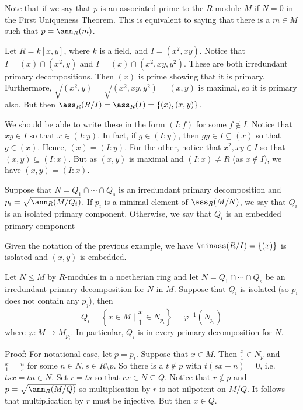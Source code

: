 \begin{rem}
Note that if we say that $p$ is an associated prime to the $R$-module $M$ if $N=0$ in the First Uniqueness Theorem. This is equivalent to saying that there is a $m \in M$ such that $p=\ann_R(m)$. 
\end{rem}

\begin{ex}
Let $R=k[x,y]$, where $k$ is a field, and $I=(x^2,xy)$. Notice that $I=(x) \cap (x^2,y)$ and $I=(x) \cap (x^2,xy,y^2)$. These are both irredundant primary decompositions. Then $(x)$ is prime showing that it is primary. Furthermore, $\sqrt{(x^2,y)}=\sqrt{(x^2,xy,y^2)}=(x,y)$ is maximal, so it is primary also. But then $\ass_R(R/I)=\ass_R(I)=\{(x),(x,y)\}$. 

We should be able to write these in the form $(I:f)$ for some $f \notin I$. Notice that $xy \in I$ so that $x \in (I:y)$. In fact, if $g \in (I:y)$, then $gy \in I \subseteq (x)$ so that $g \in (x)$. Hence, $(x)=(I:y)$. For the other, notice that $x^2,xy \in I$ so that $(x,y) \subseteq (I:x)$. But as $(x,y)$ is maximal and $(I:x) \neq R$ (as $x \notin I$), we have $(x,y)=(I:x)$. 
\end{ex}

\begin{dfn}
Suppose that $N=Q_1 \cap \cdots \cap Q_s$ is an irredundant primary decomposition and $p_i=\sqrt{\ann_R(M/Q_i)}$. If $p_i$ is a minimal element of $\ass_R(M/N)$, we say that $Q_i$ is an isolated primary component. Otherwise, we say that $Q_i$ is an embedded primary component
\end{dfn}

\begin{ex}
Given the notation of the previous example, we have $\minass(R/I)=\{(x)\}$ is isolated and $(x,y)$ is embedded. 
\end{ex}

\begin{thmm}
Let $N \leq M$ by $R$-modules in a noetherian ring and let $N=Q_1 \cap \cdots \cap Q_s$ be an irredundant primary decomposition for $N$ in $M$. Suppose that $Q_i$ is isolated (so $p_i$ does not contain any $p_j$), then
\[
Q_i=\left\{x \in M \;|\; \frac{x}{1} \in N_{p_i} \right\}= \varphi^{-1}(N_{p_i})
\]
where $\varphi: M \to M_{p_i}$. In particular, $Q_i$ is in every primary decomposition for $N$. 
\end{thmm}

\noindent Proof: For notational ease, let $p=p_i$. Suppose that $x \in M$. Then $\frac{x}{1} \in N_p$ and $\frac{x}{1}=\frac{n}{s}$ for some $n \in N, s \in R \setminus p$. So there is a $t \notin p$ with $t(sx-n)=0$, i.e. $tsx=tn \in N$. Set $r=ts$ so that $rx \in N \subseteq Q$. Notice that $r \notin p$ and $p=\sqrt{\ann_R(M/Q)}$ so multiplication by $r$ is not nilpotent on $M/Q$. It follows that multiplication by $r$ must be injective. But then $x \in Q$. 

